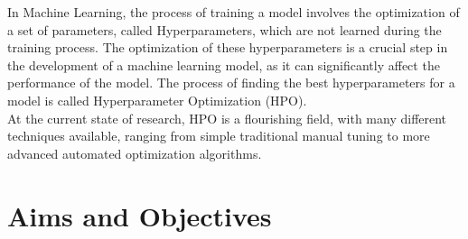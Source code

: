 In Machine Learning, the process of training a model involves the optimization of a set of parameters, called Hyperparameters, which are not learned during the training process. The optimization of these hyperparameters is a crucial step in the development of a machine learning model, as it can significantly affect the performance of the model. The process of finding the best hyperparameters for a model is called Hyperparameter Optimization (HPO).
\\[0.3cm]At the current state of research, HPO is a flourishing field, with many different techniques available, ranging from simple traditional manual tuning to more advanced automated optimization algorithms.

\section{Aims and Objectives}

